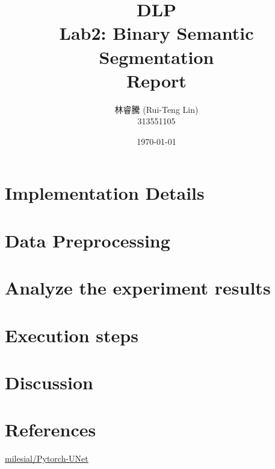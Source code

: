\documentclass[11pt]{article}
\title{DLP\\ Lab2: Binary Semantic Segmentation\\Report}
\author{林睿騰 (Rui-Teng Lin)\\
313551105}
\date{\today}
\begin{document}
\begin{CJK*}{UTF8}{bsmi}  %
    \maketitle



    \newpage

    \tableofcontents

    \newpage

    
    \section{Implementation Details}

    

    \section{Data Preprocessing}

    

    \section{Analyze the experiment results}
    
    

    \section{Execution steps}

    

    \section{Discussion}
    
    

    \section{References}
    \href{https://github.com/milesial/Pytorch-UNet}{milesial/Pytorch-UNet}

\end{CJK*}  %
\end{document}

